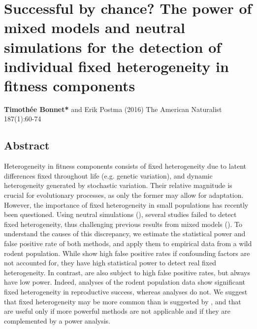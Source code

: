 
\chapter[\texorpdfstring{Chapter 2 \\Successful by chance? The power of mixed models and neutral simulations for the detection of individual fixed heterogeneity in fitness components}{Chapter 2 -- Successful by chance? The power of mixed models and neutral simulations for the detection of individual fixed heterogeneity in fitness components}]{Successful by chance? The power of mixed models and neutral simulations for the detection of individual fixed heterogeneity in fitness components}
\label{chap:dynhet}

\textbf{Timoth\'{e}e Bonnet*} and Erik Postma (2016) The American Naturalist 187(1):60-74\\

\section{Abstract}
Heterogeneity in fitness components consists of fixed heterogeneity due to latent differences fixed throughout life (e.g. genetic variation), and dynamic heterogeneity generated by stochastic variation. Their relative magnitude is crucial for evolutionary processes, as only the former may allow for adaptation. 
However, the importance of fixed heterogeneity in small populations has recently been questioned. Using neutral simulations (\NSM), several studies failed to detect fixed heterogeneity, thus challenging previous results from mixed models (\MM).
To understand the causes of this discrepancy, we estimate the statistical power and false positive rate of both methods, and apply them to empirical data from a wild rodent population.
    While \MM show high false positive rates if confounding factors are not accounted for, they have high statistical power to detect real fixed heterogeneity. In contrast, \NSM are also subject to high false positive rates, but always have low power. Indeed, \MM analyses of the rodent population data show significant fixed heterogeneity in reproductive success, whereas \NSM analyses do not.
   We suggest that fixed heterogeneity may be more common than is suggested by \NSM, and that \NSM are useful only if more powerful methods are not applicable and if they are complemented by a power analysis.

